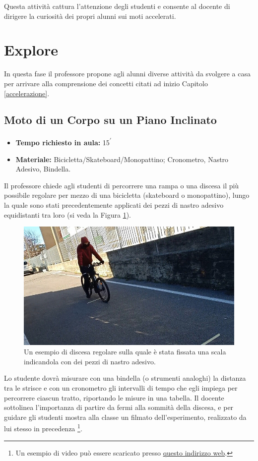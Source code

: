\documentclass{report} \usepackage[T1]{fontenc} \usepackage[italian]{babel}
\begin{document}
Questa attività cattura l’attenzione degli studenti e consente al docente
di dirigere la curiosità dei propri alunni sui moti accelerati.

\section{Explore}

In questa fase il professore propone agli alunni diverse attività da svolgere a
casa per arrivare alla comprensione dei concetti citati ad inizio Capitolo \ref{accelerazione}.

\subsection{Moto di un Corpo su un Piano Inclinato}

\begin{itemize}
\item \textbf{Tempo richiesto in aula:} 15\textsuperscript{$\prime$}
\item \textbf{Materiale:} Bicicletta/Skateboard/Monopattino; Cronometro,
Nastro Adesivo, Bindella.
\end{itemize}

Il professore chiede agli studenti di percorrere una rampa o
una discesa il più possibile regolare per mezzo di una bicicletta (skateboard o
monopattino), lungo la quale sono stati precedentemente applicati dei pezzi di nastro
adesivo equidistanti tra loro (si veda la Figura \ref{fig:bicicletta_rampa}).
\begin{figure}[H]
\centering
  \includegraphics[width=\textwidth]{bicicletta_rampa}
  \caption{Un esempio di discesa regolare sulla quale è stata fissata
           una scala indicandola con dei pezzi di nastro adesivo.
          }
  \label{fig:bicicletta_rampa}
\end{figure}
Lo studente dovrà misurare con una bindella (o strumenti analoghi)
la distanza tra le strisce e con un cronometro gli intervalli di tempo che egli impiega
per percorrere ciascun tratto, riportando le misure in una tabella.
Il docente sottolinea l’importanza di partire da fermi alla sommità della
discesa, e per guidare gli studenti  mostra alla classe un filmato
dell’esperimento, realizzato da lui stesso in precedenza
\footnote{
          Un esempio di video può essere scaricato presso
          \textcolor{blue}{\href{https://github.com/savaroskij/PED1/blob/master/progetto_finale/media/video/bicletta_rampa.mp4?raw=true}{questo indirizzo web}}.
         }.
\end{document}

